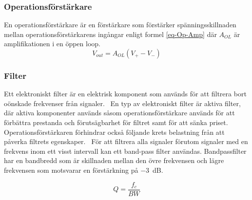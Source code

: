 \documentclass[a4paper]{article}
\begin{document}
\begin{sloppypar}
    \subsubsection{Operationsförstärkare}
    En operationsförstärkare är en förstärkare som förstärker spänningsskillnaden mellan operationsförstärkarens ingångar enligt formel \ref{eq-Op-Amp} där $A_{OL}$ är amplifikationen i en öppen loop.~\cite{wiki:Operational-amplifier}
    \begin{equation}
        \label{eq-Op-Amp}
        V_{out} = A_{OL}(V_+ - V_-)
    \end{equation}


    \subsubsection{Filter}
    Ett elektroniskt filter är en elektrisk komponent som används för att filtrera bort oönskade frekvenser från signaler.~\cite{wiki:Electronic-filter}
    En typ av elektroniskt filter är aktiva filter, där aktiva komponenter används såsom operationsförstärkare används för att förbättra prestanda och förutsägbarhet för filtret samt för att sänka priset.
    Operationsförstärkaren förhindrar också följande krets belastning från att påverka filtrets egenskaper.~\cite{wiki:Active-filter}
    För att filtrera alla signaler förutom signaler med en frekvens inom ett visst intervall kan ett band-pass filter användas.
    Bandpassfilter har en bandbredd som är skillnaden mellan den övre frekvensen och lägre frekvensen som motsvarar en förstärkning på $-3$~dB.~\cite{wiki:Band-pass-filter}

    \begin{equation}
        \label{eq-Q}
        Q = \frac{f_{c}}{BW}
    \end{equation}


\end{sloppypar}
\end{document}
